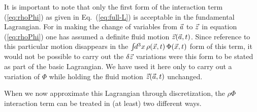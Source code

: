     It is important to note that only the first form of the
interaction term (\ref{eq:rhoPhi}) as given in Eq.~(\ref{eq:full-L})
is acceptable in the fundamental Lagrangian.
    For in making the change of variables from ${\vec a}$ to ${\vec z}$ in
equation (\ref{eq:rhoPhi}) one has assumed a definite fluid motion
${\vec z}({\vec a},t)$.
    Since reference to this particular motion disappears in the 
$\int\!\! d^3x\, \rho({\vec x},t)\, \Phi({\vec x},t)$ form of this term, it would
not be possible to carry out the $\delta {\vec z}$ variations were this
form to be stated as part of the basic Lagrangian.
    We have used it here only to carry out a variation of $\Phi$
while holding the fluid motion ${\vec z}({\vec a},t)$ unchanged.

    When we now approximate this Lagrangian through discretization,
the $\rho\Phi$ interaction term can be treated in (at least) two
different ways.  

